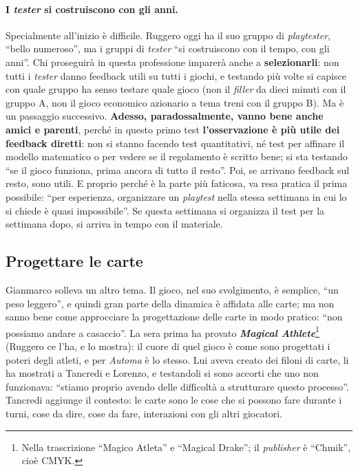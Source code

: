 \paragraph{I \emph{tester} si costruiscono con gli anni.} Specialmente all'inizio è
difficile. Ruggero oggi ha il suo gruppo di \emph{playtester}, ``bello numeroso'', ma i
gruppi di \emph{tester} ``si costruiscono con il tempo, con gli anni''. Chi proseguirà in
questa professione imparerà anche a \textbf{selezionarli}: non tutti i \emph{tester} danno
feedback utili su tutti i giochi, e testando più volte si capisce con quale gruppo ha
senso testare quale gioco (non il \emph{filler} da dieci minuti con il gruppo A, non il
gioco economico azionario a tema treni con il gruppo B). Ma è un passaggio successivo.
\textbf{Adesso, paradossalmente, vanno bene anche amici e parenti}, perché in questo
primo test \textbf{l'osservazione è più utile dei feedback diretti}: non si stanno facendo
test quantitativi, né test per affinare il modello matematico o per vedere se il
regolamento è scritto bene; si sta testando ``se il gioco funziona, prima ancora di tutto
il resto''. Poi, se arrivano feedback sul resto, sono utili. E proprio perché è la parte
più faticosa, va resa pratica il prima possibile: ``per esperienza, organizzare un
\emph{playtest} nella stessa settimana in cui lo si chiede è quasi impossibile''. Se
questa settimana si organizza il test per la settimana dopo, si arriva in tempo con il
materiale.

\subsection{Progettare le carte}

Gianmarco solleva un altro tema. Il gioco, nel suo svolgimento, è semplice, ``un peso
leggero'', e quindi gran parte della dinamica è affidata alle carte; ma non sanno bene
come approcciare la progettazione delle carte in modo pratico: ``non possiamo andare a
casaccio''. La sera prima ha provato \textbf{\emph{Magical Athlete}}\footnote{Nella
trascrizione ``Magico Atleta'' e ``Magical Drake''; il \emph{publisher} è ``Chmik'', cioè
CMYK.} (Ruggero ce l'ha, e lo mostra): il cuore di quel gioco è come sono progettati i
poteri degli atleti, e per \emph{Automa} è lo stesso. Lui aveva creato dei filoni di carte,
li ha mostrati a Tancredi e Lorenzo, e testandoli si sono accorti che uno non funzionava:
``stiamo proprio avendo delle difficoltà a strutturare questo processo''. Tancredi aggiunge
il contesto: le carte sono le cose che si possono fare durante i turni, cose da dire,
cose da fare, interazioni con gli altri giocatori.

